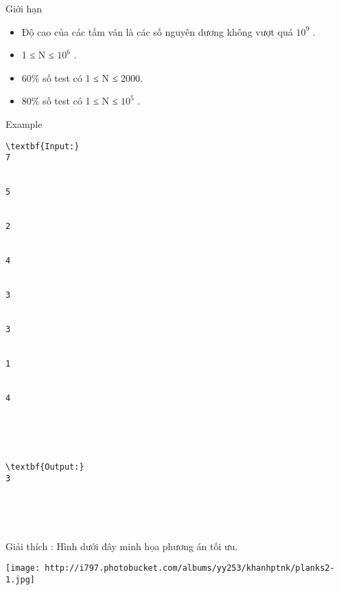 Giới hạn
\begin{itemize}
	\item     Độ cao của các tấm ván là các số nguyên dương không vượt quá $10^{9}$    .   
	\item     1 ≤ N ≤ $10^{6}$    .   
	\item     60\% số test có 1 ≤ N ≤ 2000.   
	\item     80\% số test có 1 ≤ N ≤ $10^{5}$    .   
\end{itemize}
Example
\begin{verbatim}
\textbf{Input:}
7


5


2


4


3


3


1


4





\textbf{Output:}
3





\end{verbatim}

Giải thích        : Hình dưới đây minh họa phương án tối ưu.


\texttt{[image: http://i797.photobucket.com/albums/yy253/khanhptnk/planks2-1.jpg]}
